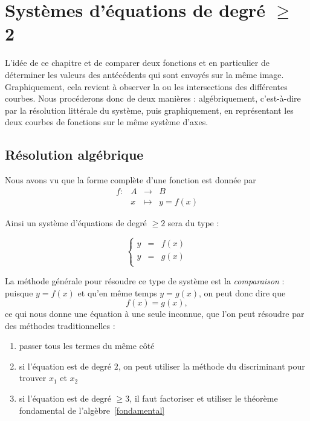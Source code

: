 \chapter{Systèmes d'équations de degré $\geq$ 2}

L'idée de ce chapitre et de comparer deux fonctions et en particulier de déterminer les valeurs des antécédents qui sont envoyés sur la même image. Graphiquement, cela revient à observer la ou les intersections des différentes courbes. Nous procéderons donc de deux manières : algébriquement, c'est-à-dire par la résolution littérale du système, puis graphiquement, en représentant les deux courbes de fonctions sur le même système d'axes.

\section{Résolution algébrique}

Nous avons vu que la forme complète d'une fonction est donnée par
$$
\begin{array}{llcl}
f:&A&\longrightarrow&B\\
&x&\mapsto&y=f(x)
\end{array}
$$

Ainsi un système d'équations de degré $\geq 2$ sera du type :

$$
\left\{
\begin{array}{lcl}
y&=&f(x)\\
y&=&g(x)\\
\end{array}
\right.
$$

La méthode générale pour résoudre ce type de système est la \emph{comparaison} : puisque $y = f(x)$ et qu'en même temps $y = g(x)$, on peut donc dire que 
$$
f(x) = g(x),
$$
ce qui nous donne une équation à une seule inconnue, que l'on peut résoudre par des méthodes traditionnelles :
\begin{enumerate}
\item passer tous les termes du même côté
\item si l'équation est de degré $2$, on peut utiliser la méthode du discriminant pour trouver $x_1$ et $x_2$
\item si l'équation est de degré $\geq 3$, il faut factoriser et utiliser le théorème fondamental de l'algèbre~\ref{fondamental}
\end{enumerate}

\vspace{1cm}


